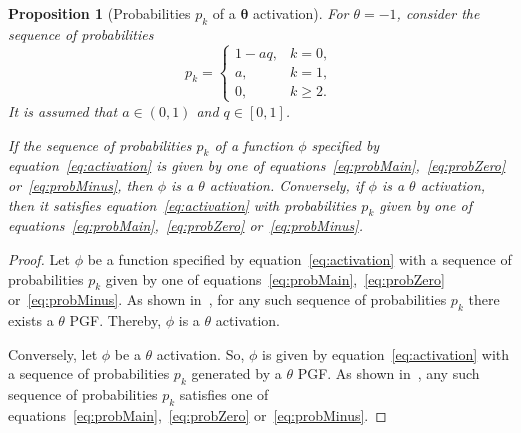 \documentclass[final, 12pt]{colt2021} %
\newtheorem{prop}{Proposition}
\begin{document}
\begin{prop}[Probabilities $p_k$ of a $\boldsymbol{\theta}$ activation]
For $\theta=-1$, consider the sequence of probabilities
\begin{equation}\label{eq:probMinus}
p_k =
\left\{
\begin{array}{ll}
1-aq,  & k = 0,\\
a, & k = 1,\\
0, & k \ge 2.
\end{array}
\right.
\end{equation}
It is assumed that $a \in (0, 1)$ and $q \in [0, 1]$.


If the sequence of probabilities $p_k$
of a function $\phi$ specified by equation~\eqref{eq:activation}
is given by one of
equations~\eqref{eq:probMain},~\eqref{eq:probZero} or~\eqref{eq:probMinus},
then $\phi$ is a $\theta$ activation.
Conversely, if $\phi$ is a $\theta$ activation,
then it satisfies equation~\eqref{eq:activation} with probabilities $p_k$
given by one of
equations~\eqref{eq:probMain},~\eqref{eq:probZero} or~\eqref{eq:probMinus}.
\end{prop}

\begin{proof}
Let $\phi$ be a function specified by equation~\eqref{eq:activation}
with a sequence of probabilities $p_k$ given by one of
equations~\eqref{eq:probMain},~\eqref{eq:probZero} or~\eqref{eq:probMinus}.
As shown in~\citet{sagitov2016},
for any such sequence of probabilities $p_k$ there exists a $\theta$ PGF.
Thereby, $\phi$ is a $\theta$ activation.

Conversely, let $\phi$ be a $\theta$ activation.
So, $\phi$ is given by equation~\eqref{eq:activation}
with a sequence of probabilities $p_k$ generated by a $\theta$ PGF.
As shown in~\citet{sagitov2016},
any such sequence of probabilities $p_k$
satisfies one of
equations~\eqref{eq:probMain},~\eqref{eq:probZero} or~\eqref{eq:probMinus}.
\end{proof}


\end{document}
